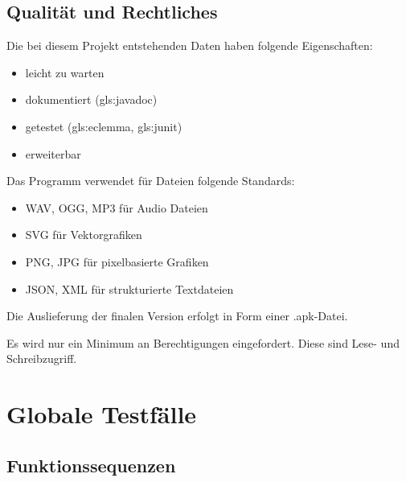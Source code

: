 \documentclass{scrartcl}
\begin{document}
\subsection{Qualität und Rechtliches}

\begin{nflist}[resume]
	\item Die bei diesem Projekt entstehenden Daten haben folgende Eigenschaften:
	\begin{itemize}
		\item leicht zu warten
		\item dokumentiert (\gls{gls:javadoc})
		\item getestet (\gls{gls:eclemma}, \gls{gls:junit})
		\item erweiterbar
	\end{itemize}
	\item Das Programm verwendet für Dateien folgende Standards: 
	\begin{itemize}
		\item WAV, OGG, MP3 für Audio Dateien 
		\item SVG für Vektorgrafiken
		\item PNG, JPG für pixelbasierte Grafiken
		\item JSON, XML für strukturierte Textdateien
	\end{itemize}
	\item Die Auslieferung der finalen Version erfolgt in Form einer .apk-Datei.
	\item Es wird nur ein Minimum an Berechtigungen eingefordert. Diese sind Lese- und Schreibzugriff.
\end{nflist}

\clearpage








\section{Globale Testfälle}

\subsection{Funktionssequenzen}
\end{document}
